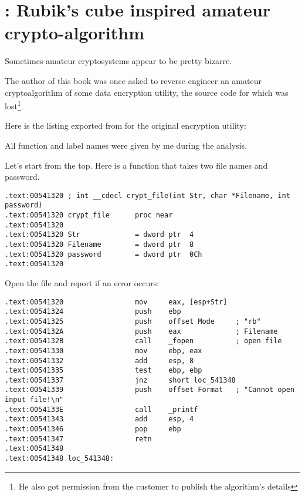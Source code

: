 \section{
: Rubik's cube inspired amateur crypto-algorithm}

Sometimes amateur cryptosystems appear to be pretty bizarre.

The author of this book was once asked to reverse engineer an amateur cryptoalgorithm of some data encryption utility, 
the source code for which was lost\footnote{He also got permission from the customer to publish the algorithm's details}.

Here is the listing exported from \IDA for the original encryption utility:



All function and label names were given by me during the analysis.

Let's start from the top. Here is a function that takes two file names and password.

\begin{lstlisting}[style=customasmx86]
.text:00541320 ; int __cdecl crypt_file(int Str, char *Filename, int password)
.text:00541320 crypt_file      proc near
.text:00541320
.text:00541320 Str             = dword ptr  4
.text:00541320 Filename        = dword ptr  8
.text:00541320 password        = dword ptr  0Ch
.text:00541320
\end{lstlisting}

Open the file and report if an error occurs:

\begin{lstlisting}[style=customasmx86]
.text:00541320                 mov     eax, [esp+Str]
.text:00541324                 push    ebp
.text:00541325                 push    offset Mode     ; "rb"
.text:0054132A                 push    eax             ; Filename
.text:0054132B                 call    _fopen          ; open file
.text:00541330                 mov     ebp, eax
.text:00541332                 add     esp, 8
.text:00541335                 test    ebp, ebp
.text:00541337                 jnz     short loc_541348
.text:00541339                 push    offset Format   ; "Cannot open input file!\n"
.text:0054133E                 call    _printf
.text:00541343                 add     esp, 4
.text:00541346                 pop     ebp
.text:00541347                 retn
.text:00541348
.text:00541348 loc_541348:
\end{lstlisting}

